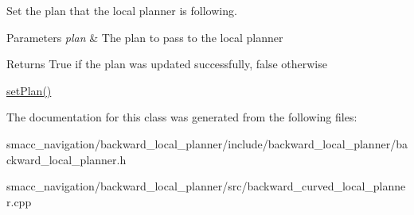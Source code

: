 Set the plan that the local planner is following. 


\begin{DoxyParams}{Parameters}
{\em plan} & The plan to pass to the local planner \\
\hline
\end{DoxyParams}
\begin{DoxyReturn}{Returns}
True if the plan was updated successfully, false otherwise
\end{DoxyReturn}
\hyperlink{classbackward__local__planner_1_1BackwardLocalPlanner_ad2f7c554f1e107a58ac650d377646f27}{set\-Plan()} 

The documentation for this class was generated from the following files\-:\begin{DoxyCompactItemize}
\item 
smacc\-\_\-navigation/backward\-\_\-local\-\_\-planner/include/backward\-\_\-local\-\_\-planner/backward\-\_\-local\-\_\-planner.\-h\item 
smacc\-\_\-navigation/backward\-\_\-local\-\_\-planner/src/backward\-\_\-curved\-\_\-local\-\_\-planner.\-cpp\end{DoxyCompactItemize}
